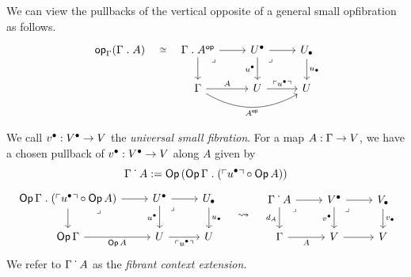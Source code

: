 We can view the pullbacks of the vertical opposite of a general small
opfibration as follows.
\[ \begin{tikzcd}
	{\vOp[\Gamma]{(\Gamma \opext A)}} & {\Gamma \opext A^\op} & \Uupp & \Ulow \\
	& \Gamma & \U & \U
  \arrow["\iso"{description}, draw=none, from=1-1, to=1-2]
	\arrow[from=1-2, to=1-3]
	\arrow[from=1-2, to=2-2]
	\arrow["\lrcorner"{anchor=center, pos=0.125}, draw=none, from=1-2, to=2-3]
	\arrow[from=1-3, to=1-4]
	\arrow["\uupp"', from=1-3, to=2-3]
	\arrow["\lrcorner"{anchor=center, pos=0.125}, draw=none, from=1-3, to=2-4]
	\arrow["\ulow", from=1-4, to=2-4]
	\arrow["A", from=2-2, to=2-3]
	\arrow["{A^\op}"', bend right, from=2-2, to=2-4]
	\arrow["{\ulcorner \uupp \urcorner}", from=2-3, to=2-4]
\end{tikzcd} \]

We call ${v^\bullet} : {V^\bullet} \to V$ the \emph{universal small fibration}.
For a map $A : \Gamma \to V$,
we have a chosen pullback of ${v^\bullet} : {V^\bullet} \to V$ along $A$
given by
\[\Gamma \mathrel{\dot{\,}} A := \mathop{\mathsf{Op}}{(\mathop{\mathsf{Op}}{\Gamma} \mathrel{.} (\ulcorner {u^{\bullet}} \urcorner \circ \mathop{\mathsf{Op}}{A}))}\]
\[ \begin{tikzcd}
    {\Op{\Gamma} \opext (\ulcorner \uupp \urcorner \circ \Op{A})} & \Uupp & \Ulow \\
    {\Op{\Gamma}} & \U & \U
    \arrow[from=1-1, to=1-2]
    \arrow[from=1-1, to=2-1]
    \arrow["\lrcorner"{anchor=center, pos=0.125}, draw=none, from=1-1, to=2-2]
    \arrow[from=1-2, to=1-3]
    \arrow["\uupp"', from=1-2, to=2-2]
    \arrow["\lrcorner"{anchor=center, pos=0.125}, draw=none, from=1-2, to=2-3]
    \arrow["\ulow", from=1-3, to=2-3]
    \arrow["{\Op{A}}"', from=2-1, to=2-2]
    \arrow["{\ulcorner \uupp \urcorner}"', from=2-2, to=2-3]
  \end{tikzcd}
  \quad \rightsquigarrow \quad
  \begin{tikzcd}
    {\Gamma \ext A} & \Vlow & \Vupp \\
    \Gamma & \V & \V
    \arrow[from=1-1, to=1-2]
    \arrow["{d_A}"', from=1-1, to=2-1]
    \arrow["\lrcorner"{anchor=center, pos=0.125}, draw=none, from=1-1, to=2-2]
    \arrow[from=1-2, to=1-3]
    \arrow["\vlow"', from=1-2, to=2-2]
    \arrow["\lrcorner"{anchor=center, pos=0.125}, draw=none, from=1-2, to=2-3]
    \arrow["\vupp", from=1-3, to=2-3]
    \arrow["A"', from=2-1, to=2-2]
    \arrow[from=2-2, to=2-3]
  \end{tikzcd}\]
We refer to $\Gamma \mathrel{\dot{\,}} A$ as the \emph{fibrant context extension}.

